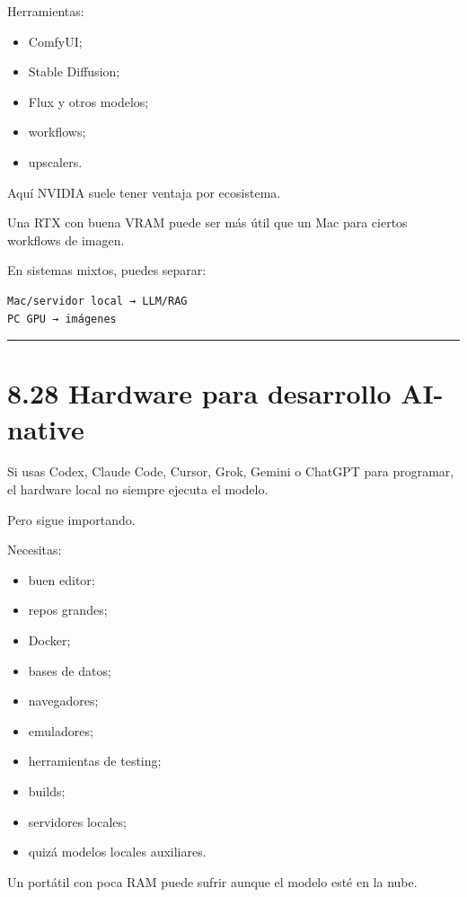 Herramientas:

\begin{itemize}
\tightlist
\item
  ComfyUI;
\item
  Stable Diffusion;
\item
  Flux y otros modelos;
\item
  workflows;
\item
  upscalers.
\end{itemize}

Aquí NVIDIA suele tener ventaja por ecosistema.

Una RTX con buena VRAM puede ser más útil que un Mac para ciertos
workflows de imagen.

En sistemas mixtos, puedes separar:

\begin{lstlisting}
Mac/servidor local → LLM/RAG
PC GPU → imágenes
\end{lstlisting}

\begin{center}\rule{0.5\linewidth}{0.5pt}\end{center}

\section{8.28 Hardware para desarrollo
AI-native}\label{hardware-para-desarrollo-ai-native}

Si usas Codex, Claude Code, Cursor, Grok, Gemini o ChatGPT para
programar, el hardware local no siempre ejecuta el modelo.

Pero sigue importando.

Necesitas:

\begin{itemize}
\tightlist
\item
  buen editor;
\item
  repos grandes;
\item
  Docker;
\item
  bases de datos;
\item
  navegadores;
\item
  emuladores;
\item
  herramientas de testing;
\item
  builds;
\item
  servidores locales;
\item
  quizá modelos locales auxiliares.
\end{itemize}

Un portátil con poca RAM puede sufrir aunque el modelo esté en la nube.

